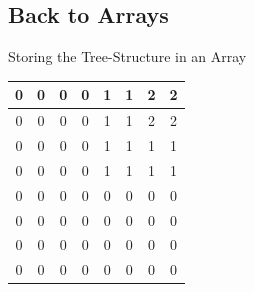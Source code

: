 \documentclass[fleqn,11pt,aspectratio=43]{beamer}
\begin{document}
\subsection{Back to Arrays}
	\begin{frame}{Storing the Tree-Structure in an Array}
		\centering
		\begin{tabular}{ | c | c | c | c | c | c | c | c |}
			\hline
  			0 & 0 & 0 & 0 & 1 & 1 & 2 & 2 \\ \hline
  			0 & 0 & 0 & 0 & 1 & 1 & 2 & 2 \\ \hline
  			0 & 0 & 0 & 0 & 1 & 1 & 1 & 1 \\ \hline
			0 & 0 & 0 & 0 & 1 & 1 & 1 & 1 \\ \hline
  			0 & 0 & 0 & 0 & 0 & 0 & 0 & 0 \\ \hline
  			0 & 0 & 0 & 0 & 0 & 0 & 0 & 0 \\ \hline
  			0 & 0 & 0 & 0 & 0 & 0 & 0 & 0 \\ \hline
  			0 & 0 & 0 & 0 & 0 & 0 & 0 & 0 \\ \hline
		\end{tabular}
	\end{frame}
\end{document}
